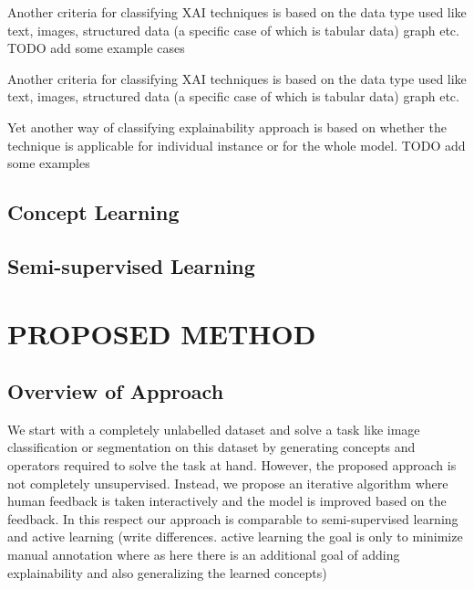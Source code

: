 \documentclass{JMLFS}
\begin{document}
Another criteria for classifying XAI techniques is based on the data type used like text, images, structured data (a specific case of which is tabular data) graph etc.
TODO add some example cases

Another criteria for classifying XAI techniques is based on the data type used like text, images, structured data (a specific case of which is tabular data) graph etc.

Yet another way of classifying explainability approach is based on whether the technique is applicable for individual instance or for the whole model.
TODO add some examples

\subsection{Concept Learning}
\subsection{Semi-supervised Learning}

\section{{ PROPOSED METHOD}}\label{proposed_method}

\subsection{Overview of Approach}
We start with a completely unlabelled dataset and solve a task like image classification or segmentation on this dataset by generating concepts and operators required to solve the task at hand.
However, the proposed approach is not completely unsupervised.
Instead, we propose an iterative algorithm where human feedback is taken interactively and the model is improved based on the feedback.
In this respect our approach is comparable to semi-supervised learning and active learning (write differences. active learning the goal is only to minimize manual annotation where as here there is an additional goal of adding explainability and also generalizing the learned concepts)
\end{document}
